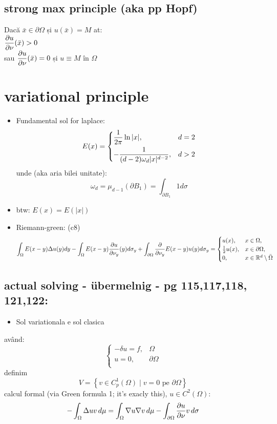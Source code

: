 \documentclass[11pt]{article}
\newcommand{\R}{\mathbb{R}} \newcommand{\C}{\mathbb{C}}
\begin{document}
\subsection*{strong max principle (aka pp Hopf)}
\label{sec:org6c3cc80}
Dacă \(\bar{x} \in \partial \Omega\) și \(u(\bar{x}) = M\) at:\\
\(\displaystyle \frac{\partial u}{\partial \nu} (\bar{x}) >0\)\\
sau \(\displaystyle \frac{\partial u}{\partial \nu} (\bar{x}) = 0\) și \(u \equiv M\) în \(\Omega\)   
\section*{variational principle}
\label{sec:orgaed78f4}
\begin{itemize}
\item Fundamental sol for laplace:
\[
E(x) = \begin{dcases}
\frac{1}{2\pi} \ln|x|, & d=2\\
-\frac{1}{(d-2)\omega_d|x|^{d-2}},& d> 2
\end{dcases}
\]
unde (aka aria bilei unitate):
\[\omega_d = \mu_{d-1}(\partial B_1) = \int_{\partial B_1}  1 d \sigma \]
\end{itemize}
\begin{itemize}
\item btw: \(E(x) = E(|x|)\)
\item Riemann-green: (c8)
\[
\int_\Omega E(x-y) \Delta u(y) dy - \int_\Omega E(x-y) \parti{u}{\nu_y}(y) d\sigma_y +
\int_{\partial\Omega}  \parti{}{\nu_y}E(x-y) u(y) d\sigma_y =
\begin{cases}
u(x), & x \in \Omega,\\
\frac{1}{2} u(x), & x \in \partial\Omega,\\
0, & x \in \R^d \setminus \bar{\Omega}
\end{cases}
\]
\end{itemize}
\subsection*{actual solving - übermelnig - pg 115,117,118, 121,122:}
\label{sec:org0e022df}
\begin{itemize}
\item Sol variationala e sol clasica
\end{itemize}
având:
 \[
\begin{cases}
 - \delta u = f, &\Omega\\
 u= 0, &\partial\Omega\\
\end{cases}
 \]
definim
\[V = \left\{v \in C^1_p(\Omega) \mid v=0 \text{ pe } \partial \Omega \right\}\]
calcul formal (via Green formula 1; it's exacly this), \(u\in C^2(\Omega)\):
\[-\int_\Omega \Delta u v\, d\mu = \int_\Omega \nabla u\nabla v\,d\mu-
 \int_{\partial\Omega} \frac{\partial u}{\partial \nu} v\,d\sigma\]
\end{document}
